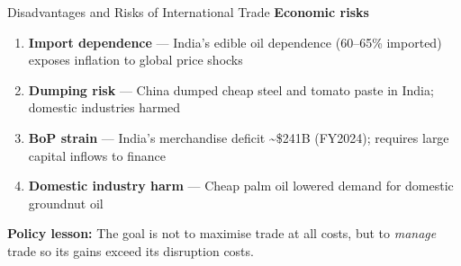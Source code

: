 \documentclass[
  ignorenonframetext,
  aspectratio=169,
]{beamer}
\makeatletter
\providecommand{\tightlist}{%
  \setlength{\itemsep}{0pt}\setlength{\parskip}{0pt}}
\let\quarto@originallabel\label
\DeclareRobustCommand*{\label}[1]{\quarto@originallabel{#1}}
\makeatother
\begin{document}
\begin{frame}{Disadvantages and Risks of International Trade}
\label{disadvantages-and-risks-of-international-trade}
\textbf{Economic risks}

\begin{enumerate}
\tightlist
\item
  \textbf{Import dependence} --- India's edible oil dependence (60--65\%
  imported) exposes inflation to global price shocks
\item
  \textbf{Dumping risk} --- China dumped cheap steel and tomato paste in
  India; domestic industries harmed
\item
  \textbf{BoP strain} --- India's merchandise deficit
  \textasciitilde\$241B (FY2024); requires large capital inflows to
  finance
\item
  \textbf{Domestic industry harm} --- Cheap palm oil lowered demand for
  domestic groundnut oil
\end{enumerate}

\textbf{Policy lesson:} The goal is not to maximise trade at all costs,
but to \emph{manage} trade so its gains exceed its disruption costs.

\end{frame}
\end{document}
